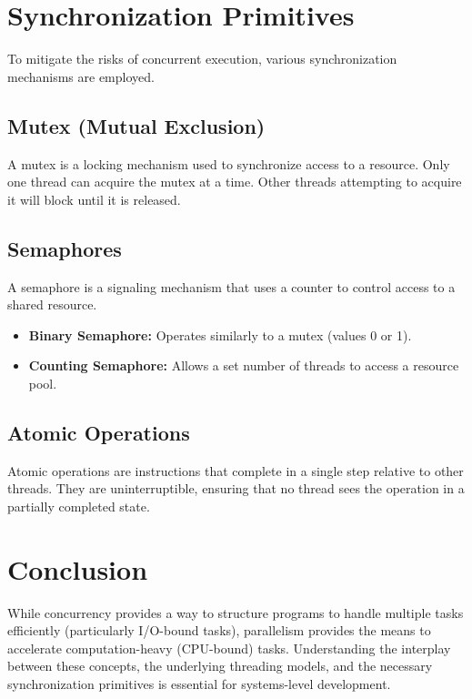 \documentclass{article}
\begin{document}
\section{Synchronization Primitives}
To mitigate the risks of concurrent execution, various synchronization mechanisms are employed.

\subsection{Mutex (Mutual Exclusion)}
A mutex is a locking mechanism used to synchronize access to a resource. Only one thread can acquire the mutex at a time. Other threads attempting to acquire it will block until it is released.

\subsection{Semaphores}
A semaphore is a signaling mechanism that uses a counter to control access to a shared resource.
\begin{itemize}
  \item \textbf{Binary Semaphore:} Operates similarly to a mutex (values 0 or 1).
  \item \textbf{Counting Semaphore:} Allows a set number of threads to access a resource pool.
\end{itemize}

\subsection{Atomic Operations}
Atomic operations are instructions that complete in a single step relative to other threads. They are uninterruptible, ensuring that no thread sees the operation in a partially completed state.

\section{Conclusion}
While concurrency provides a way to structure programs to handle multiple tasks efficiently (particularly I/O-bound tasks), parallelism provides the means to accelerate computation-heavy (CPU-bound) tasks. Understanding the interplay between these concepts, the underlying threading models, and the necessary synchronization primitives is essential for systems-level development.
\end{document}
